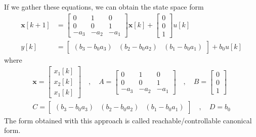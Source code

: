 \documentclass[twoside]{article}
\begin{document}
%
If we gather these equations, we can obtain the state space form
%
\begin{align*}
  \mathbf{x}[k+1] &= \left[ \begin{array}{ccc} 0 & 1 & 0 \\ 0 & 0 & 1
    \\ -a_3 & -a_2 & -a_1 \end{array} \right] \mathbf{x}[k]
   + 
  \left[ \begin{array}{c} 0\\ 0 
    \\ 1 \end{array} \right] u[k]
\\
y[k] &= \left[ \begin{array}{ccc} (b_3 - b_0 a_3) &  (b_2 - b_0 a_2) &
                                                                       (b_1 - b_0 a_1) \end{array} \right]
+ b_0 u[k]
\end{align*}
%
where 
%
\begin{align*}
\mathbf{x} = \left[ \begin{array}{c} x_1[k] \\ x_2[k] \\
x_1[k] \end{array} \right] \quad , \quad
A = \left[ \begin{array}{ccc} 0 & 1 & 0 \\ 0 & 0 & 1
    \\ -a_3 & -a_2 & -a_1 \end{array} \right]
\quad , \quad 
B = \left[ \begin{array}{c} 0\\ 0 
    \\ 1 \end{array} \right]
\\ C = \left[ \begin{array}{ccc} (b_3 - b_0 a_3) &  (b_2 - b_0 a_2) &
   (b_1 - b_0 a_1) \end{array} \right]
\quad , \quad
D = b_0
\end{align*}
%
The form obtained with this approach is called
reachable/controllable canonical form. 
\end{document}
